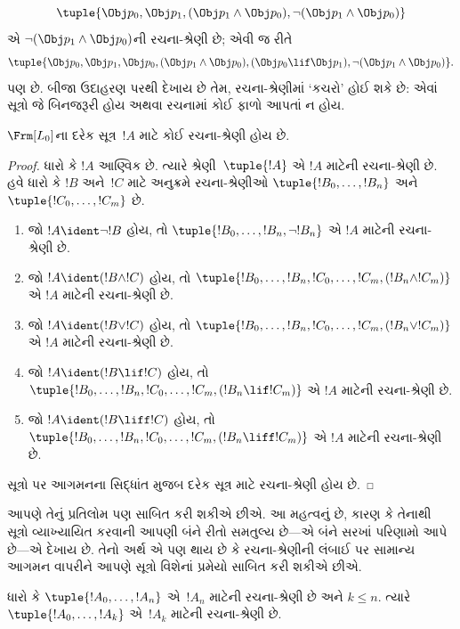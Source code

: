 \begin{ex}
\[
\tuple{
    \Obj p_0,
    \Obj p_1,
    (\Obj p_1 \land \Obj p_0),
    \lnot (\Obj p_1 \land \Obj p_0)
}
\]
એ $\lnot (\Obj p_1 \land \Obj p_0)$ની રચના-શ્રેણી છે; એવી જ રીતે
\[
\tuple{
    \Obj p_0,
    \Obj p_1,
    \Obj p_0,
    (\Obj p_1 \land \Obj p_0),
    (\Obj p_0 \lif \Obj p_1),
    \lnot (\Obj p_1 \land \Obj p_0)
}.
\]
પણ છે.
બીજા ઉદાહરણ પરથી દેખાય છે તેમ, રચના-શ્રેણીમાં `કચરો' હોઈ શકે છે:
એવાં સૂત્રો જે બિનજરૂરી હોય અથવા રચનામાં કોઈ ફાળો આપતાં ન હોય.
\end{ex}

\begin{prop}
$\Frm[L_0]$ના દરેક સૂત્ર~$!A$ માટે કોઈ રચના-શ્રેણી હોય છે.
\end{prop}

\begin{proof}
ધારો કે $!A$ આણ્વિક છે. ત્યારે શ્રેણી~$\tuple{!A}$ એ $!A$ માટેની
રચના-શ્રેણી છે.
હવે ધારો કે $!B$ અને~$!C$ માટે અનુક્રમે રચના-શ્રેણીઓ
$\tuple{!B_0,\dotsc,!B_n}$ અને $\tuple{!C_0,\dotsc,!C_m}$ છે.
\begin{enumerate}
  \item જો $!A \ident \lnot !B$ હોય,
      તો $\tuple{!B_0,\dotsc,!B_n,\lnot !B_n}$
      એ $!A$ માટેની રચના-શ્રેણી છે.
  \item જો $!A \ident (!B \land !C)$ હોય,
      તો $\tuple{!B_0,\dotsc,!B_n,!C_0,\dotsc,!C_m,(!B_n \land !C_m)}$
      એ $!A$ માટેની રચના-શ્રેણી છે.
  \item જો $!A \ident (!B \lor !C)$ હોય,
      તો $\tuple{!B_0,\dotsc,!B_n,!C_0,\dotsc,!C_m,(!B_n \lor !C_m)}$
      એ $!A$ માટેની રચના-શ્રેણી છે.
  \item જો $!A \ident (!B \lif !C)$ હોય,
      તો $\tuple{!B_0,\dotsc,!B_n,!C_0,\dotsc,!C_m,(!B_n \lif !C_m)}$
      એ $!A$ માટેની રચના-શ્રેણી છે.
  \item જો $!A \ident (!B \liff !C)$ હોય,
      તો $\tuple{!B_0,\dotsc,!B_n,!C_0,\dotsc,!C_m,(!B_n \liff !C_m)}$
      એ $!A$ માટેની રચના-શ્રેણી છે.
\end{enumerate}
સૂત્રો પર આગમનના સિદ્ધાંત મુજબ દરેક સૂત્ર માટે
રચના-શ્રેણી હોય છે.
\end{proof}

આપણે તેનું પ્રતિલોમ પણ સાબિત કરી શકીએ છીએ. આ મહત્વનું છે, કારણ કે
તેનાથી સૂત્રો વ્યાખ્યાયિત કરવાની આપણી બંને રીતો સમતુલ્ય છે---એ બંને
સરખાં પરિણામો આપે છે---એ દેખાય છે. તેનો અર્થ એ પણ થાય છે કે
રચના-શ્રેણીની લંબાઈ પર સામાન્ય આગમન વાપરીને આપણે સૂત્રો વિશેનાં
પ્રમેયો સાબિત કરી શકીએ છીએ.

\begin{lem}
ધારો કે $\tuple{!A_0,\dotsc,!A_n}$ એ~$!A_n$ માટેની રચના-શ્રેણી છે
અને $k\leq n$. ત્યારે $\tuple{!A_0,\dotsc,!A_k}$ એ~$!A_k$ માટેની
રચના-શ્રેણી છે.
\end{lem}

